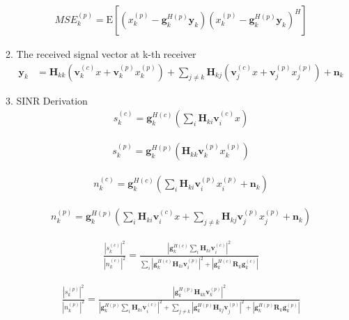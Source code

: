 \documentclass[11pt, oneside]{article}   	%
\begin{document}
\begin{align*}
MSE^{(p)}_{k} = \mathrm{E}	[	(	x^{(p)}_{k}-\textbf{g}^{H(p)}_{k}	\textbf{y}_{k}	)(x^{(p)}_{k}-\textbf{g}^{H(p)}_{k}	\textbf{y}_{k})^{H}	]
\end{align*}






2. The received signal vector at k-th receiver
\begin{align*}
\textbf{y}_{k} &= \textbf{H}_{kk}
			(\textbf{v}^{(c)}_{k}x
			+\textbf{v}^{(p)}_{k}x^{(p)}_{k})
			+\displaystyle\sum_{j \neq k}\textbf{H}_{kj}(\textbf{v}^{(c)}_{j}x+\textbf{v}^{(p)}_{j}x^{(p)}_{j})
			+\textbf{n}_{k}
\end{align*}

3. SINR Derivation
\begin{align*}
s^{(c)}_{k} = \textbf{g}^{H(c)}_{k}
		(\displaystyle\sum_{i}
		\textbf{H}_{ki} 
		\textbf{v}^{(c)}_{i}x)
\end{align*}

\begin{align*}
s^{(p)}_{k} = \textbf{g}^{H(p)}_{k}
		(\textbf{H}_{kk} 
		\textbf{v}^{(p)}_{k}x^{(p)}_{k})
\end{align*}

\begin{align*}
n^{(c)}_{k} = \textbf{g}^{H(c)}_{k}
		(\displaystyle\sum_{i}
		\textbf{H}_{ki} 
		\textbf{v}^{(p)}_{i}x^{(p)}_{i}
		+\textbf{n}_{k})
\end{align*}

\begin{align*}
n^{(p)}_{k} = \textbf{g}^{H(p)}_{k}
		(\displaystyle\sum_{i}
		\textbf{H}_{ki} 
		\textbf{v}^{(c)}_{i}x
		+\displaystyle\sum_{j \neq k}\textbf{H}_{kj}\textbf{v}^{(p)}_{j}x^{(p)}_{j}
		+\textbf{n}_{k})
\end{align*}

\begin{align*}
\frac	{	|s^{(c)}_{k}|^2	}{	|n^{(c)}_{k}|^2	} = 
\frac {	|\textbf{g}^{H(c)}_{k}
		\displaystyle\sum_{i}
		\textbf{H}_{ki} 
		\textbf{v}^{(c)}_{i}|^2	
	} 
	{	\displaystyle\sum_{i}
		|\textbf{g}^{H(c)}_{k}
		\textbf{H}_{ki} 
		\textbf{v}^{(p)}_{i}|^2
		+|\textbf{g}^{H(c)}_{k}
		\textbf{R}_{k}
		\textbf{g}^{(c)}_{k}|
	}
\end{align*}

\begin{align*}
\frac	{	|s^{(p)}_{k}|^2	}{	|n^{(p)}_{k}|^2	} = 
\frac {|\textbf{g}^{H(p)}_{k}
		\textbf{H}_{kk} 
		\textbf{v}^{(p)}_{k}|^2	
	} 
	{	|\textbf{g}^{H(p)}_{k}
		\displaystyle\sum_{i}
		\textbf{H}_{ki} 
		\textbf{v}^{(c)}_{i}|^2
		+\displaystyle\sum_{j \neq k}
		|\textbf{g}^{H(p)}_{k}
		\textbf{H}_{kj} 
		\textbf{v}^{(p)}_{j}|^2
		+|\textbf{g}^{H(p)}_{k}
		\textbf{R}_{k}
		\textbf{g}^{(p)}_{k}|
	}
\end{align*}
\end{document}
